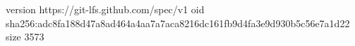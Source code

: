 version https://git-lfs.github.com/spec/v1
oid sha256:adc8fa188d47a8ad464a4aa7a7aca8216dc161fb9d4fa3e9d930b5c56e7a1d22
size 3573
